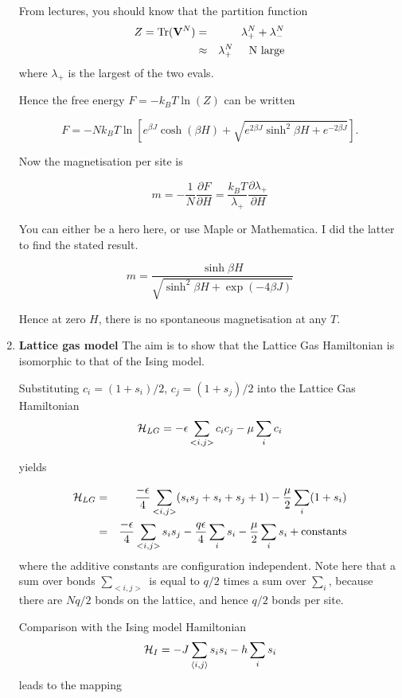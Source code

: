 \documentclass[a4paper,12pt,twoside]{article}
\begin{document}
\begin{enumerate}
From lectures, you should know that the partition function
\begin{eqnarray*}
Z={\rm Tr}({\bf V}^N)&=&\lambda_+^N+\lambda_-^N\\
&\approx & \lambda_+^N \hspace{5mm}{\rm N~large}
\end{eqnarray*}
where $\lambda_+$ is the largest of the two evals.

Hence the free energy $F=-k_BT\ln(Z)$ can be written 

\[
F=-Nk_BT\ln \left[e^{\beta J}\cosh(\beta H) + \sqrt{e^{2\beta J}\sinh^2\beta H+e^{-2\beta J}}\right].
\]

Now the magnetisation per site is 

\[
m=-\frac{1}{N}\frac{\partial F}{\partial H}=\frac{k_BT}{\lambda_+}\frac{\partial \lambda_+}{\partial H}
\]

You can either be a hero here, or use Maple or Mathematica. I did the latter to find
the stated result.

\[
m=\frac{\sinh \beta H}{\sqrt{\sinh^2\beta H+\exp{(-4\beta J)}}}
\]

Hence at zero $H$, there is no spontaneous magnetisation at any $T$.

\item {\bf Lattice gas model}
The aim is to show that the Lattice Gas Hamiltonian is isomorphic to that of the Ising model.

Substituting $c_i=(1+s_i)/2$, $c_j=(1+s_j)/2$ into the Lattice Gas
Hamiltonian
\begin{equation}
{\cal H}_{LG}=-\epsilon\sum_{<i,j>}c_ic_j -\mu\sum_ic_i
\end{equation}

yields

\begin{eqnarray*}
{\cal H}_{LG}&=&\frac{-\epsilon}{4}\sum_{<i,j>}(s_is_j+s_i+s_j+1)-\frac{\mu}{2}\sum_i(1+s_i)\\
           &=&\frac{-\epsilon}{4}\sum_{<i,j>}s_is_j-\frac{q\epsilon}{4}\sum_i s_i-\frac{\mu}{2}\sum_is_i +{\rm constants}\\
\end{eqnarray*}
where the additive constants are configuration independent. Note here
that a sum over bonds $\sum_{<i,j>}$ is equal to $q/2$ times a sum over $\sum_i$, because
there are $Nq/2$ bonds on the lattice, and hence $q/2$ bonds per site.

Comparison with the Ising model Hamiltonian 
\[
{\cal H}_I=-J\sum_{\langle i,j\rangle}s_is_i-h\sum_i s_i
\]
 leads to the mapping


\end{enumerate}
\end{document}

